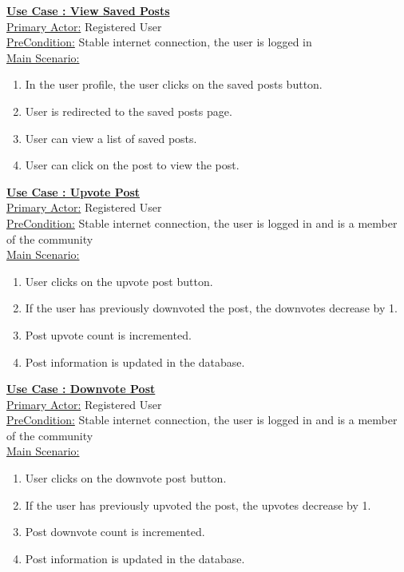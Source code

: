 \documentclass[conference,compsoc]{IEEEtran}
\newcounter{UC}
\newcommand{\nextU}{\stepcounter{UC}\theUC}
\begin{document}
\underline{\textbf{Use Case \nextU: View Saved Posts}}\\

\underline{Primary Actor:} Registered User\\

\underline{PreCondition:} Stable internet connection, the user is logged in\\

\underline{Main Scenario:}\\
\begin{enumerate}
    \item In the user profile, the user clicks on the saved posts button.
    \item User is redirected to the saved posts page.
    \item User can view a list of saved posts.
    \item User can click on the post to view the post.
\end{enumerate}

\underline{\textbf{Use Case \nextU: Upvote Post}}\\

\underline{Primary Actor:} Registered User\\

\underline{PreCondition:} Stable internet connection, the user is logged in and is a member of the community\\

\underline{Main Scenario:}\\
\begin{enumerate}
    \item User clicks on the upvote post button.
    \item If the user has previously downvoted the post, the downvotes decrease by 1.
    \item Post upvote count is incremented.
    \item Post information is updated in the database.
\end{enumerate}

\underline{\textbf{Use Case \nextU: Downvote Post}}\\

\underline{Primary Actor:} Registered User\\

\underline{PreCondition:} Stable internet connection, the user is logged in and is a member of the community\\

\underline{Main Scenario:}\\
\begin{enumerate}
    \item User clicks on the downvote post button.
    \item If the user has previously upvoted the post, the upvotes decrease by 1.
    \item Post downvote count is incremented.
    \item Post information is updated in the database.
\end{enumerate}
\end{document}

